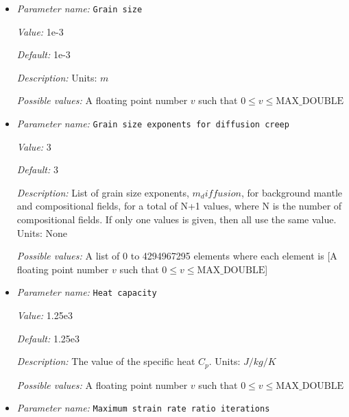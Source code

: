 \begin{itemize}
{\it Default:} 1.0


{\it Description:} Scaling coefficient for effective viscosity.


{\it Possible values:} A floating point number $v$ such that $0 \leq v \leq \text{MAX\_DOUBLE}$
\item {\it Parameter name:} {\tt Grain size}
\label{parameters:Material model/Diffusion dislocation/Grain size}


{\it Value:} 1e-3


{\it Default:} 1e-3


{\it Description:} Units: $m$


{\it Possible values:} A floating point number $v$ such that $0 \leq v \leq \text{MAX\_DOUBLE}$
\item {\it Parameter name:} {\tt Grain size exponents for diffusion creep}
\label{parameters:Material model/Diffusion dislocation/Grain size exponents for diffusion creep}


{\it Value:} 3


{\it Default:} 3


{\it Description:} List of grain size exponents, $m_diffusion$, for background mantle and compositional fields, for a total of N+1 values, where N is the number of compositional fields. If only one values is given, then all use the same value.  Units: None


{\it Possible values:} A list of 0 to 4294967295 elements where each element is [A floating point number $v$ such that $0 \leq v \leq \text{MAX\_DOUBLE}$]
\item {\it Parameter name:} {\tt Heat capacity}
\label{parameters:Material model/Diffusion dislocation/Heat capacity}


{\it Value:} 1.25e3


{\it Default:} 1.25e3


{\it Description:} The value of the specific heat $C_p$. Units: $J/kg/K$


{\it Possible values:} A floating point number $v$ such that $0 \leq v \leq \text{MAX\_DOUBLE}$
\item {\it Parameter name:} {\tt Maximum strain rate ratio iterations}
\label{parameters:Material model/Diffusion dislocation/Maximum strain rate ratio iterations}



\end{itemize}
